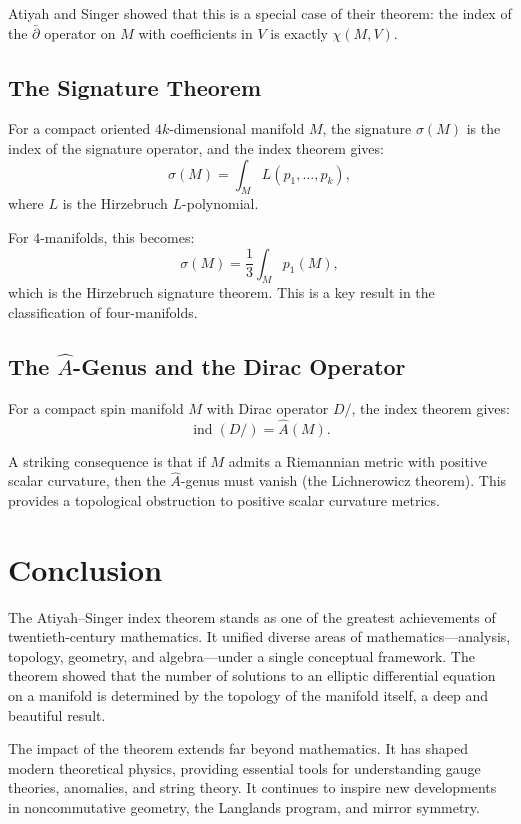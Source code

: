 Atiyah and Singer showed that this is a special case of their theorem: the index of the $\bar\partial$ operator on $M$ with coefficients in $V$ is exactly $\chi(M, V)$.

\subsection{The Signature Theorem}

For a compact oriented $4k$-dimensional manifold $M$, the signature $\sigma(M)$ is the index of the signature operator, and the index theorem gives:
\[
\sigma(M) = \int_M L(p_1, \ldots, p_k),
\]
where $L$ is the Hirzebruch $L$-polynomial.

For $4$-manifolds, this becomes:
\[
\sigma(M) = \frac{1}{3} \int_M p_1(M),
\]
which is the Hirzebruch signature theorem. This is a key result in the classification of four-manifolds.

\subsection{The $\widehat A$-Genus and the Dirac Operator}

For a compact spin manifold $M$ with Dirac operator $D\!\!\!\!/$, the index theorem gives:
\[
\operatorname{ind}(D\!\!\!\!/) = \widehat A(M).
\]

A striking consequence is that if $M$ admits a Riemannian metric with positive scalar curvature, then the $\widehat A$-genus must vanish (the Lichnerowicz theorem). This provides a topological obstruction to positive scalar curvature metrics.

\section{Conclusion}

The Atiyah--Singer index theorem stands as one of the greatest achievements of twentieth-century mathematics. It unified diverse areas of mathematics---analysis, topology, geometry, and algebra---under a single conceptual framework. The theorem showed that the number of solutions to an elliptic differential equation on a manifold is determined by the topology of the manifold itself, a deep and beautiful result.

The impact of the theorem extends far beyond mathematics. It has shaped modern theoretical physics, providing essential tools for understanding gauge theories, anomalies, and string theory. It continues to inspire new developments in noncommutative geometry, the Langlands program, and mirror symmetry.

